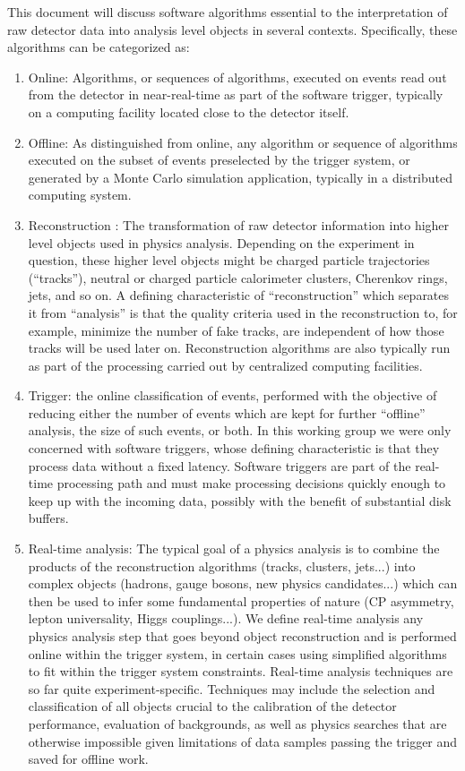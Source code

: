This document will discuss software algorithms essential to the interpretation of raw detector data into analysis level objects in several contexts. Specifically, these algorithms can be categorized as: 
\begin{enumerate}
\item Online: Algorithms, or sequences of algorithms, executed on events read out from the detector in near-real-time as part of the software trigger, typically on a computing facility located close to the detector itself.
\item Offline: As distinguished from online, any algorithm or sequence of algorithms executed on the subset of events preselected by the trigger system, or generated by a Monte Carlo simulation application, typically in a distributed computing system.
\item
Reconstruction : The transformation of raw detector information into higher level objects used in physics analysis. Depending on the experiment in question, these higher level objects might be charged particle trajectories (“tracks”), neutral or charged particle calorimeter clusters, Cherenkov rings, jets, and so on. A defining characteristic of “reconstruction” which separates it from “analysis” is that the quality criteria used in the reconstruction to, for example, minimize the number of fake tracks, are independent of how those tracks will be used later on. Reconstruction algorithms are also typically run as part of the processing carried out by centralized computing facilities.
\item
Trigger: the online classification of events, performed with the objective of reducing either the number of events which are kept for further “offline” analysis, the size of such events, or both. In this working group we were only concerned with software triggers, whose defining characteristic is that they process data without a fixed latency. Software triggers are part of the real-time processing path and must make processing decisions quickly enough to keep up with the incoming data, possibly with the benefit of substantial disk buffers.
\item
Real-time analysis: The typical goal of a physics analysis is to combine the products of the reconstruction algorithms (tracks, clusters, jets...) into complex objects (hadrons, gauge bosons, new physics candidates...) which can then be used to infer some fundamental properties of nature (CP asymmetry, lepton universality, Higgs couplings...). We define real-time analysis any physics analysis step that goes beyond object reconstruction and is performed online within the trigger system, in certain cases using simplified algorithms to fit within the trigger system constraints. Real-time analysis techniques are so far quite experiment-specific. Techniques may include the selection and classification of all objects crucial to the calibration of the detector performance, evaluation of backgrounds, as well as physics searches that are otherwise impossible given limitations of data samples passing the trigger and saved for offline work.
\end{enumerate}

